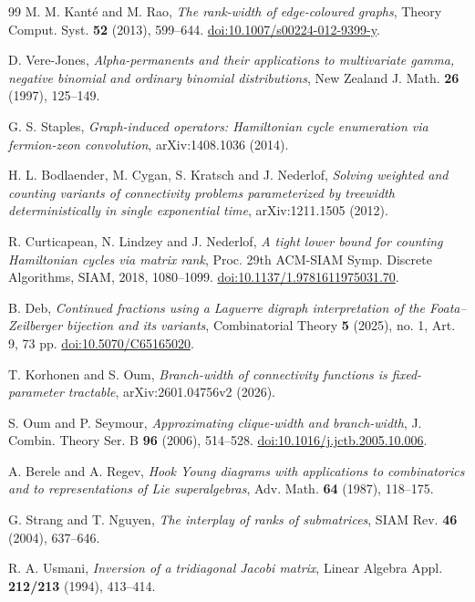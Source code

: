 \documentclass[11pt,reqno]{amsart}
\theoremstyle{remark}
\numberwithin{equation}{section}
\begin{document}
\begin{thebibliography}{99}
 M. M. Kant\'e and M. Rao,
\emph{The rank-width of edge-coloured graphs},
Theory Comput. Syst. \textbf{52} (2013), 599--644.
\href{https://doi.org/10.1007/s00224-012-9399-y}{doi:10.1007/s00224-012-9399-y}.

 D. Vere-Jones,
\emph{Alpha-permanents and their applications to multivariate gamma,
negative binomial and ordinary binomial distributions},
New Zealand J. Math. \textbf{26} (1997), 125--149.

 G. S. Staples,
\emph{Graph-induced operators: Hamiltonian cycle enumeration via
fermion-zeon convolution}, arXiv:1408.1036 (2014).

 H. L. Bodlaender, M. Cygan, S. Kratsch and J. Nederlof,
\emph{Solving weighted and counting variants of connectivity problems
parameterized by treewidth deterministically in single exponential time},
arXiv:1211.1505 (2012).

 R. Curticapean, N. Lindzey and J. Nederlof,
\emph{A tight lower bound for counting Hamiltonian cycles via matrix rank},
Proc. 29th ACM-SIAM Symp. Discrete Algorithms, SIAM, 2018, 1080--1099.
\href{https://doi.org/10.1137/1.9781611975031.70}{doi:10.1137/1.9781611975031.70}.

 B. Deb,
\emph{Continued fractions using a Laguerre digraph interpretation of
the Foata--Zeilberger bijection and its variants},
Combinatorial Theory \textbf{5} (2025), no. 1, Art. 9, 73 pp.
\href{https://doi.org/10.5070/C65165020}{doi:10.5070/C65165020}.

 T. Korhonen and S. Oum,
\emph{Branch-width of connectivity functions is fixed-parameter tractable},
arXiv:2601.04756v2 (2026).

 S. Oum and P. Seymour,
\emph{Approximating clique-width and branch-width}, J. Combin.
Theory Ser. B \textbf{96} (2006), 514--528.
\href{https://doi.org/10.1016/j.jctb.2005.10.006}{doi:10.1016/j.jctb.2005.10.006}.

 A. Berele and A. Regev,
\emph{Hook Young diagrams with applications to combinatorics and to
representations of Lie superalgebras},
Adv. Math. \textbf{64} (1987), 118--175.

 G. Strang and T. Nguyen,
\emph{The interplay of ranks of submatrices},
SIAM Rev. \textbf{46} (2004), 637--646.

 R. A. Usmani,
\emph{Inversion of a tridiagonal Jacobi matrix},
Linear Algebra Appl. \textbf{212/213} (1994), 413--414.


\end{thebibliography}
\end{document}
